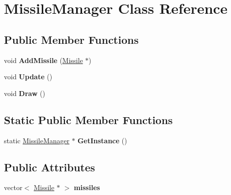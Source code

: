 \hypertarget{class_missile_manager}{}\section{Missile\+Manager Class Reference}
\label{class_missile_manager}
\subsection*{Public Member Functions}
\begin{DoxyCompactItemize}
\item 
void {\bfseries Add\+Missile} (\hyperlink{class_missile}{Missile} $\ast$)\hypertarget{class_missile_manager_a6b859d173d4706d7e24c3bb923e7b40c}{}\label{class_missile_manager_a6b859d173d4706d7e24c3bb923e7b40c}

\item 
void {\bfseries Update} ()\hypertarget{class_missile_manager_a25bcacc2a8dd02d7b068e42519bee49f}{}\label{class_missile_manager_a25bcacc2a8dd02d7b068e42519bee49f}

\item 
void {\bfseries Draw} ()\hypertarget{class_missile_manager_a2579a213c6c9d45430fe663e1b0198ae}{}\label{class_missile_manager_a2579a213c6c9d45430fe663e1b0198ae}

\end{DoxyCompactItemize}
\subsection*{Static Public Member Functions}
\begin{DoxyCompactItemize}
\item 
static \hyperlink{class_missile_manager}{Missile\+Manager} $\ast$ {\bfseries Get\+Instance} ()\hypertarget{class_missile_manager_a39043e0b83f60dee060e6f2f3a8dd109}{}\label{class_missile_manager_a39043e0b83f60dee060e6f2f3a8dd109}

\end{DoxyCompactItemize}
\subsection*{Public Attributes}
\begin{DoxyCompactItemize}
\item 
vector$<$ \hyperlink{class_missile}{Missile} $\ast$ $>$ {\bfseries missiles}\hypertarget{class_missile_manager_af59cf308293213cc99c6f6ac65809643}{}\label{class_missile_manager_af59cf308293213cc99c6f6ac65809643}

\end{DoxyCompactItemize}
